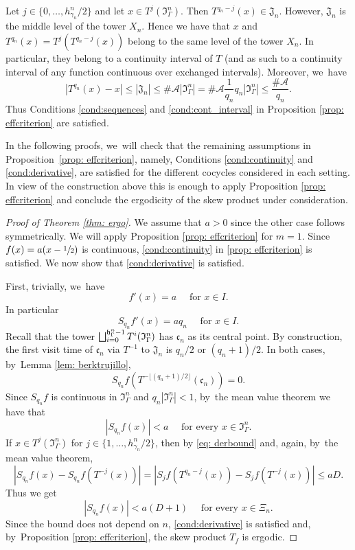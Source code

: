 \documentclass[JEP,XML,SOM,Unicode,NoEqCountersInSection,NoFloatCountersInSection,published]{cedram}
\let\oldbigsqcup\bigsqcup
\renewcommand{\bigsqcup}{\mathop{\textstyle\oldbigsqcup}\displaylimits}
\theoremstyle{plain}
\theoremstyle{definition}
\newcommand{\A}{\mathcal{A}}
\begin{document}
Let $j\in\{0,\ldots,h_{\gamma_n}^n/2\}$ and let $x\in T^j(\mathfrak I_{\Gamma}^n)$. Then $T^{q_n-j}(x)\in \mathfrak J_n$. However, $\mathfrak J_n$ is the middle level of the tower $X_n$. Hence we have that $x$
and $T^{q_n}(x)=T^{j}(T^{q_n-j}(x))$ belong to the same level of the tower $X_n$. In particular, they belong to a continuity interval of $T$ (and as such to a continuity interval of any function continuous over exchanged intervals). Moreover, we~have
\[
|T^{q_n}(x)-x|\le |\mathfrak J_n|\le \#\A|\mathfrak I_{\Gamma}^n|=
\#\A\frac{1}{q_n} q_n|\mathfrak I_{\Gamma}^n|\le \frac{\#\A}{q_n}.
\]
Thus Conditions \eqref{cond:sequences} and \eqref{cond:cont_interval} in Proposition \ref{prop: effcriterion} are satisfied.

In the following proofs, we~will check that the remaining assumptions in Proposition~\ref{prop: effcriterion}, namely, Conditions \eqref{cond:continuity} and \eqref{cond:derivative}, are satisfied for the different cocycles considered in each setting. In view of the construction above this is enough to apply Proposition \ref{prop: effcriterion} and conclude the ergodicity of the skew product under consideration.

\begin{proof}[Proof of Theorem \ref{thm: ergo}]
We assume that $a>0$ since the other case follows symmetrically. We will apply Proposition \ref{prop: effcriterion} for $m=1$. Since $f(x)=a(x-\sfrac{1}{2})$ is continuous, \eqref{cond:continuity} in \ref{prop: effcriterion} is satisfied. We now show that \eqref{cond:derivative} is satisfied.

First, trivially, we~have
\[
f'(x)=a\quad\text{ for }x\in I.
\]
In particular
\[
S_{q_n} f'(x)=aq_n\quad \text{ for }x\in I.
\]
Recall that the tower $\bigsqcup_{i=0}^{\mathfrak h_{\Gamma}^n-1}T^i(\mathfrak I_{\Gamma}^n)$ has $\mathfrak c_n$ as its central point. By construction, the first visit time of $\mathfrak c_n$ via $T^{-1}$ to $\mathfrak J_n$ is $q_{n}/2$ or $(q_n+1)/2$. In both cases, by~Lemma \ref{lem: berktrujillo},
\[
S_{q_n}f(T^{-\lfloor (q_n+1)/2\rfloor}(\mathfrak c_n))=0.
\]
Since $S_{q_n}f$ is continuous in $\mathfrak I_{\Gamma}^n$ and $q_n|\mathfrak I_{\Gamma}^n|<1$, by~the mean value theorem we have that
\[
\left|S_{q_n}f(x)\right|<a\quad \text{ for every }x\in \mathfrak I_{\Gamma}^n.
\]
If $x\in T^j(\mathfrak I_{\Gamma}^n)$ for $j\in \{1,\ldots,h_{\gamma_n}^n/2\}$, then by \eqref{eq: derbound} and, again, by~the mean value theorem,
\[
\left|S_{q_n}f(x)-S_{q_n}f(T^{-j}(x)) \right|=
\left|S_j f(T^{q_n-j}(x))-S_j f(T^{-j}(x)) \right|
\le a D.
\]
Thus we get
\[
\left|S_{q_n}f(x)\right|<a(D+1) \quad \text{ for every }x\in\Xi_n.
\]
Since the bound does not depend on $n$, \eqref{cond:derivative} is satisfied and, by~Proposition \ref{prop: effcriterion}, the skew product $T_f$ is ergodic.
\end{proof}
\end{document}
